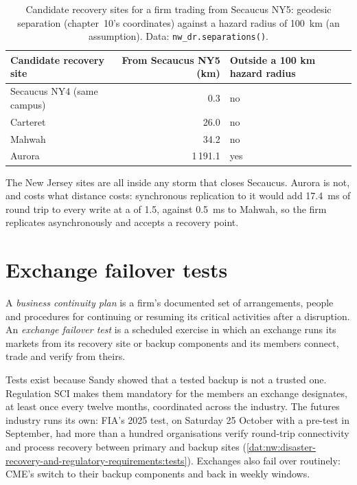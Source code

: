 \begin{table}[ht]
\centering\small
\begin{tabular}{@{}lrl@{}}
\toprule
Candidate recovery site & From Secaucus NY5 (km) & Outside a 100 km hazard radius \\
\midrule
Secaucus NY4 (same campus) & 0.3 & no \\
Carteret & 26.0 & no \\
Mahwah & 34.2 & no \\
Aurora & 1\,191.1 & yes \\
\bottomrule
\end{tabular}
\caption{Candidate recovery sites for a firm trading from Secaucus NY5: geodesic separation (chapter~10's coordinates) against a
hazard radius of \qty{100}{\kilo\metre} (an assumption). Data: \texttt{nw\_dr.separations()}.}\label{tab:nw:disaster-recovery-and-regulatory-requirements:sites}
\end{table}

The New Jersey sites are all inside any storm that closes Secaucus. Aurora is not, and costs what distance costs: synchronous
replication to it would add \qty{17.4}{\milli\second} of round trip to every write at a  of 1.5, against
\qty{0.5}{\milli\second} to Mahwah, so the firm replicates asynchronously and accepts a recovery point.

\section{Exchange failover tests}

\begin{definition}\label{def:nw:disaster-recovery-and-regulatory-requirements:test}
A \emph{business continuity plan} is a firm's documented set of arrangements, people and
procedures for continuing or resuming its critical activities after a disruption. An \emph{exchange failover test} is a scheduled exercise in which an exchange runs its markets from its recovery site or backup components and its
members connect, trade and verify from theirs.
\end{definition}

Tests exist because Sandy showed that a tested backup is not a trusted one. Regulation SCI makes them mandatory for the members an
exchange designates, at least once every twelve months, coordinated across the industry. The futures industry runs its own:
FIA's 2025 test, on Saturday 25 October with a pre-test in September, had more than a hundred organisations verify round-trip
connectivity and process recovery between primary and backup sites (\cref{dat:nw:disaster-recovery-and-regulatory-requirements:tests}).
Exchanges also fail over routinely: CME's  switch to their backup components and back in weekly windows.

